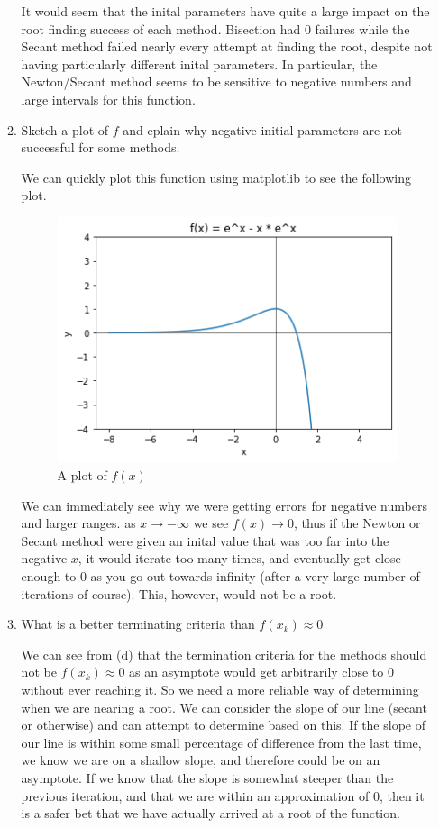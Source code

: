 \documentclass[11pt]{article}
\begin{document}
\begin{enumerate}
\begin{enumerate}
    It would seem that the inital parameters have quite a large impact on the
    root finding success of each method. Bisection had 0 failures while the
    Secant method failed nearly every attempt at finding the root, despite not
    having particularly different inital parameters. In particular, the
    Newton/Secant method seems to be sensitive to negative numbers
    and large intervals for this function.

    \newpage

\item Sketch a plot of $f$ and eplain why negative initial parameters are not
    successful for some methods.

    We can quickly plot this function using matplotlib to see the following
    plot.

    \begin{figure}[h]
        \centering
        \includegraphics[scale=.6]{output.png}
        \caption{A plot of $f(x)$ }
    \end{figure}

    We can immediately see why we were getting errors for negative numbers and
    larger ranges. as $x \to - \infty$ we see $f(x) \to 0$, thus if the Newton
    or Secant method were given an inital value that was too far into the
    negative $x$, it would iterate too many times, and eventually get close
    enough to 0 as you go out towards infinity (after a very large number of
    iterations of course). This, however, would not be a root.

\item What is a better terminating criteria than $f(x_k) \approx 0$

    We can see from (d) that the termination criteria for the methods should
    not be $f(x_k) \approx 0$ as an asymptote would get arbitrarily close to 0
    without ever reaching it. So we need a more reliable way of determining
    when we are nearing a root. We can consider the slope of our line (secant
    or otherwise) and can attempt to determine based on this. If the slope of
    our line is within some small percentage of difference from the last time,
    we know we are on a shallow slope, and therefore could be on an asymptote.
    If we know that the slope is somewhat steeper than the previous iteration,
    and that we are within an approximation of 0, then it is a safer bet that
    we have actually arrived at a root of the function.


\end{enumerate}
\end{enumerate}
\end{document}
